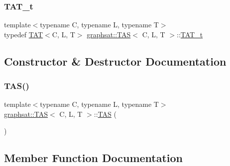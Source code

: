 \mbox{\label{classgraphsat_1_1_t_a_s_a5b94c589a76c074601aea1f18bd3d3fe}} 
\subsubsection{\texorpdfstring{TAT\_t}{TAT\_t}}
{\footnotesize\ttfamily template$<$typename C, typename L, typename T$>$ \\
typedef \mbox{\hyperlink{classgraphsat_1_1_t_a_t}{T\+AT}}$<$C, L, T$>$ \mbox{\hyperlink{classgraphsat_1_1_t_a_s}{graphsat\+::\+T\+AS}}$<$ C, L, T $>$\+::\mbox{\hyperlink{classgraphsat_1_1_t_a_s_a5b94c589a76c074601aea1f18bd3d3fe}{T\+A\+T\+\_\+t}}}



\subsection{Constructor \& Destructor Documentation}
\mbox{\label{classgraphsat_1_1_t_a_s_a334b713c32b2a690a51ee6d16cd8fe05}} 
\subsubsection{\texorpdfstring{TAS()}{TAS()}}
{\footnotesize\ttfamily template$<$typename C, typename L, typename T$>$ \\
\mbox{\hyperlink{classgraphsat_1_1_t_a_s}{graphsat\+::\+T\+AS}}$<$ C, L, T $>$\+::\mbox{\hyperlink{classgraphsat_1_1_t_a_s}{T\+AS}} (\begin{DoxyParamCaption}{ }\end{DoxyParamCaption})\hspace{0.3cm}{\ttfamily [inline]}}



\subsection{Member Function Documentation}
\mbox{\label{classgraphsat_1_1_t_a_s_a29d0f28a414aaa455a99a958642aac1c}} 

